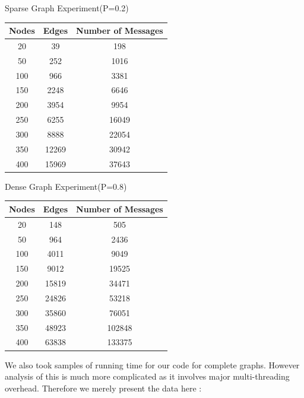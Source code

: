 \documentclass[letterpaper,11pt]{article}
\begin{document}
	\begin{center}
		Sparse Graph Experiment(P=0.2) \\ 
	\begin{tabular}{|c|c|c|}
		\hline 
		{\bf Nodes} & {\bf Edges} & {\bf Number of Messages} \\
		\hline 
		20 & 39 & 198 \\
		\hline 
		50 & 252 & 1016 \\
		\hline 
		100 & 966 & 3381 \\
		\hline
		150 & 2248 & 6646 \\
		\hline 
		200 & 3954 & 9954 \\
		\hline 
		250 & 6255 & 16049 \\
		\hline 
		300 & 8888 & 22054 \\
		\hline 
		350 & 12269 & 30942 \\
		\hline 
		400 & 15969 & 37643 \\
		\hline  
	\end{tabular}
	\end{center} 
	
	\begin{center}
		Dense Graph Experiment(P=0.8) \\ 
		\begin{tabular}{|c|c|c|}
			\hline 
			{\bf Nodes} & {\bf Edges} & {\bf Number of Messages} \\
			\hline 
			20 & 148 & 505 \\
			\hline 
			50 & 964 & 2436 \\
			\hline 
			100 & 4011 & 9049 \\
			\hline
			150 & 9012 & 19525 \\
			\hline 
			200 & 15819 & 34471 \\
			\hline 
			250 & 24826 & 53218 \\
			\hline 
			300 & 35860 & 76051 \\
			\hline 
			350 & 48923 & 102848 \\
			\hline 
			400 & 63838 & 133375 \\
			\hline  
		\end{tabular}
	\end{center} 
	
	
	We also took samples of running time for our code for complete graphs. However analysis of this is much more complicated as it involves major multi-threading overhead. Therefore we merely present the data here : 
	
\end{document}
